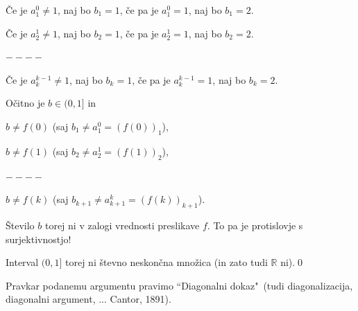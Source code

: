\documentclass[11pt,paper=b5,footinclude,headinclude]{scrbook} %
\begin{document}
Če je $a_1^0 \neq 1$, naj bo $b_1 = 1$, če pa je $a_1^0 = 1$, naj bo $b_1 = 2$.

Če je $a_2^1 \neq 1$, naj bo $b_2 = 1$, če pa je $a_2^1 = 1$, naj bo $b_2 = 2$.

$----$

Če je $a_k^{k-1} \neq 1$, naj bo $b_k = 1$, če pa je $a_k^{k-1} = 1$, naj bo $b_k = 2$.

Očitno je $b\in (0,1]$ in

$b\neq f(0)$ (saj $b_1 \neq a^0_1 = (f(0))_1$),

$b\neq f(1)$ (saj $b_2 \neq a^1_2 = (f(1))_2$),

$----$

$b\neq f(k)$ (saj $b_{k+1} \neq a^{k}_{k+1} = (f(k))_{k+1}$).

Število $b$ torej ni v zalogi vrednosti preslikave $f$. To pa je protislovje s surjektivnostjo!

Interval $(0,1]$ torej ni števno neskončna množica (in zato tudi $\mathbb{R}$ ni).\qed

\medskip
Pravkar podanemu argumentu pravimo ``Diagonalni dokaz"~(tudi diagonalizacija, diagonalni argument, ...
Cantor, 1891).

\bigskip
\end{document}

